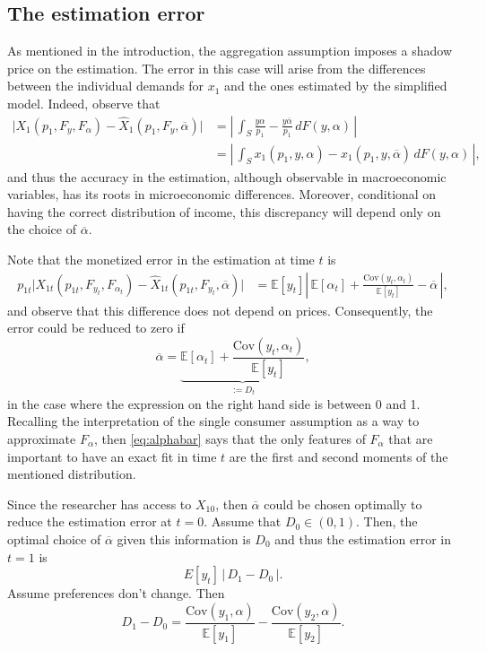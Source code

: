 \documentclass[english, a4paper,12pt]{article}
\begin{document}
\subsection{The estimation error}
As mentioned in the introduction, the aggregation assumption imposes a shadow price on the estimation. The error in this case will arise from the differences between the individual demands for $x_{1}$ and the ones estimated by the simplified model. Indeed, observe that
	\begin{align*}
		\Big| X_{1}(p_{1}, F_{y}, F_{\alpha}) - \widehat{X}_{1}(p_{1}, F_{y}, \overline{\alpha}) \Big|
			&=	\left|\, \int_{S} \frac{y \alpha}{p_{1}} - \frac{y\overline{\alpha}}{p_{1}} \, dF(y,\alpha) \,\right|	\\
			&=	\left|\, \int_{S} x_{1}(p_{1}, y, \alpha) - x_{1}(p_{1}, y, \overline{\alpha}) \, dF(y,\alpha)\, \right|,
	\end{align*}
and thus the accuracy in the estimation, although observable in macroeconomic variables, has its roots in microeconomic differences. Moreover, conditional on having the correct distribution of income, this discrepancy will depend only on the choice of $\overline{\alpha}$. 

Note that the monetized error in the estimation at time $t$ is
	\begin{align*}
		p_{1t}\Big| X_{1t}(p_{1t}, F_{y_{t}}, F_{\alpha_{t}}) - \widehat{X}_{1t}(p_{1t}, F_{y_{t}}, \overline{\alpha}) \Big|
			&=	\mathbb{E}[y_{t}]\left|\, \mathbb{E}[\alpha_{t}] + \frac{\mathrm{Cov}(y_{t},\alpha_{t})}{\mathbb{E}[y_{t}]} - \overline{\alpha}\,\right|,
	\end{align*}
and observe that this difference does not depend on prices. Consequently, the error could be reduced to zero if
	\begin{equation} \label{eq:alphabar}
		\overline{\alpha} = \underbrace{\mathbb{E}[\alpha_{t}] + \frac{\mathrm{Cov}(y_{t}, \alpha_{t})}{\mathbb{E}[y_{t}]}}_{:= D_{t}},
	\end{equation}
in the case where the expression on the right hand side is between 0 and 1. Recalling the interpretation of the single consumer assumption as a way to approximate $F_{\alpha}$, then \eqref{eq:alphabar} says that the only features of $F_{\alpha}$ that are important to have an exact fit in time $t$ are the first and second moments of the mentioned distribution. 

Since the researcher has access to $X_{10}$, then $\overline{\alpha}$ could be chosen optimally to reduce the estimation error at $t=0$. Assume that $D_{0} \in (0,1)$. Then, the optimal choice of $\overline{\alpha}$ given this information is $D_{0}$ and thus the estimation error in $t=1$ is
	$$E[y_{t}]\, \Big|\, D_{1} - D_{0}\,\Big|.$$
Assume preferences don't change. Then
	$$D_{1} - D_{0} = \frac{\mathrm{Cov}(y_{1}, \alpha)}{\mathbb{E}[y_{1}]} - \frac{\mathrm{Cov}(y_{2}, \alpha)}{\mathbb{E}[y_{2}]}.$$
	
\end{document}
